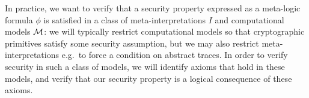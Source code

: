 In practice, we want to verify that a security property expressed as a
meta-logic formula $\phi$ is satisfied in a class of meta-interpretations
$I$ and computational models $\mathcal{M}$: we will typically restrict computational
models so that cryptographic primitives satisfy some security assumption,
but we may also restrict meta-interpretations e.g.\ to force a condition on
abstract traces. In order to verify security in such a class of models,
we will identify axioms that hold in these models, and verify that our
security property is a logical consequence of these axioms.
